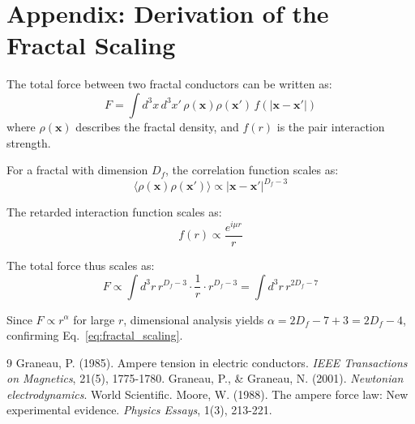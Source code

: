 	\section*{Appendix: Derivation of the Fractal Scaling}
	The total force between two fractal conductors can be written as:
	\begin{equation}
		F = \int d^3x \, d^3x' \, \rho(\mathbf{x}) \rho(\mathbf{x}') \, f(|\mathbf{x}-\mathbf{x}'|)
	\end{equation}
	where $\rho(\mathbf{x})$ describes the fractal density, and $f(r)$ is the pair interaction strength.
	
	For a fractal with dimension $D_f$, the correlation function scales as:
	\begin{equation}
		\langle \rho(\mathbf{x}) \rho(\mathbf{x}')\rangle \propto |\mathbf{x}-\mathbf{x}'|^{D_f - 3}
	\end{equation}
	
	The retarded interaction function scales as:
	\begin{equation}
		f(r) \propto \frac{e^{i\mu r}}{r}
	\end{equation}
	
	The total force thus scales as:
	\begin{equation}
		F \propto \int d^3r \, r^{D_f - 3} \cdot \frac{1}{r} \cdot r^{D_f - 3} = \int d^3r \, r^{2D_f - 7}
	\end{equation}
	
	Since $F \propto r^{\alpha}$ for large $r$, dimensional analysis yields $\alpha = 2D_f - 7 + 3 = 2D_f - 4$, confirming Eq.~\ref{eq:fractal_scaling}.
	
	\begin{thebibliography}{9}
		 Graneau, P. (1985). Ampere tension in electric conductors. \textit{IEEE Transactions on Magnetics}, 21(5), 1775-1780.
		 Graneau, P., \& Graneau, N. (2001). \textit{Newtonian electrodynamics}. World Scientific.
		 Moore, W. (1988). The ampere force law: New experimental evidence. \textit{Physics Essays}, 1(3), 213-221.
	\end{thebibliography}
